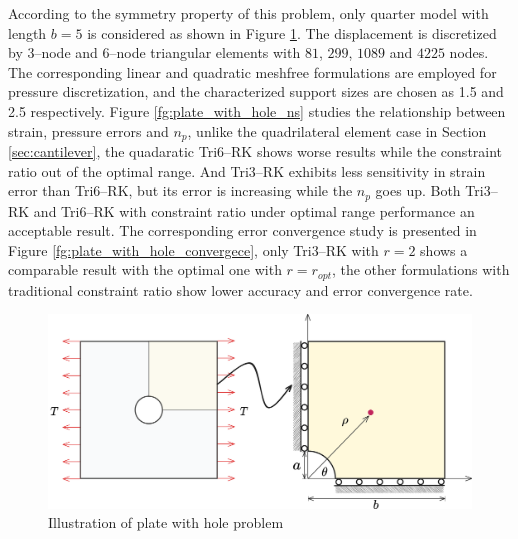 According to the symmetry property of this problem, only quarter model with length $b=5$ is considered as shown in Figure \ref{fg:plate_with_hole_model}.
The displacement is discretized by 3--node and 6--node triangular elements with $81$, $299$, $1089$ and $4225$ nodes. 
The corresponding linear and quadratic meshfree formulations are employed for pressure discretization, and the characterized support sizes are chosen as 1.5 and 2.5 respectively.
Figure \ref{fg:plate_with_hole_ns} studies the relationship between strain, pressure errors and $n_p$,
unlike the quadrilateral element case in Section \ref{sec:cantilever},
the quadaratic Tri6--RK shows worse results while the constraint ratio out of the optimal range.
And Tri3--RK exhibits less sensitivity in strain error than Tri6--RK, but its error is increasing while the $n_p$ goes up.
Both Tri3--RK and Tri6--RK with constraint ratio under optimal range performance an acceptable result.
The corresponding error convergence study is presented in Figure \ref{fg:plate_with_hole_convergece},
only Tri3--RK with $r=2$ shows a comparable result with the optimal one with $r=r_{opt}$,
the other formulations with traditional constraint ratio show lower accuracy and error convergence rate.


\begin{figure}[H]
\centering
\includegraphics[width=\textwidth]{png/plate_with_hole_model.png}
\caption{Illustration of plate with hole problem}\label{fg:plate_with_hole_model}
\end{figure}

